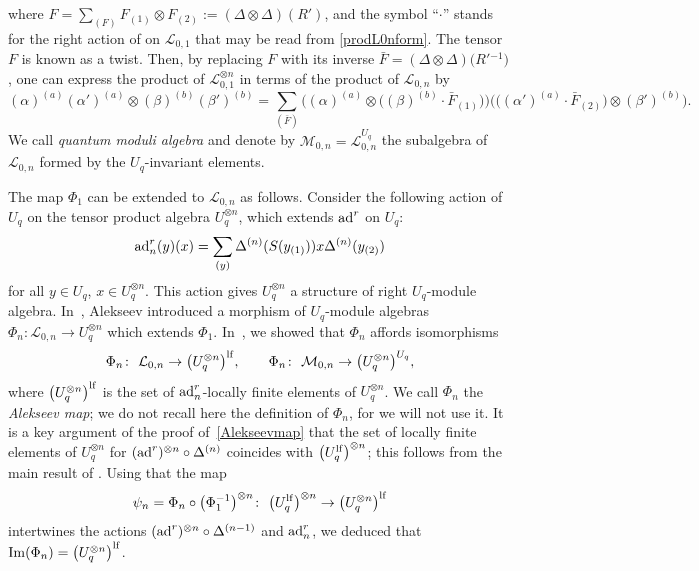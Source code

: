 \documentclass[pdftex]{sigma}
\numberwithin{equation}{section}
\theoremstyle{definition}
\newcommand{\mUq}{\mathbb{U}_q}
\newcommand{\Ll}{{\mathcal L}}
\newcommand{\Mm}{{\mathcal M}}
\newcommand{\ra}{\rightarrow}
\begin{document}
where $F=\sum_{(F)} F_{(1)}\otimes F_{(2)} := (\Delta \otimes \Delta)(R')$, and the symbol ``$\cdot$'' stands for the right action of \smash{$\mUq^{\hat \otimes 2}$} on $\Ll_{0,1}$ that may be read from \eqref{prodL0nform}. The tensor $F$ is known as a twist. Then, by replacing $F$ with its inverse $\bar{F} = (\Delta \otimes \Delta)\big(R'{}^{-1}\big)$, one can express the product of
$\Ll_{0,1}^{\otimes n}$ in terms of the product of $\Ll_{0,n}$ by
\begin{equation}\label{prodL0nform3}
(\alpha)^{(a)}(\alpha')^{(a)}\otimes (\beta)^{(b)}(\beta')^{(b)} = \sum_{(\bar{F})}\big((\alpha)^{(a)}\otimes
 \big((\beta)^{(b)}\cdot \bar{F}_{(1)}\big)\big) \big( \big((\alpha')^{(a)}\cdot \bar{F}_{(2)}\big)\otimes (\beta')^{(b)}\big).
\end{equation}
 We call {\it quantum moduli algebra} and denote by $\Mm_{0,n} = {\mathcal L}_{0,n}^{U_q}$ the subalgebra of $\Ll_{0,n}$ formed by the $U_q$-invariant elements.


The map $\Phi_1$ can be extended to $\Ll_{0,n}$ as follows. Consider the following action of $U_q$ on the tensor product algebra $U_q^{{\otimes} n}$, which extends ${\rm ad}^r$ on $U_q$:
\[%
{\rm ad}_n^r(y)(x) = \sum_{(y)}\Delta^{(n)}({S}(y_{(1)})) x \Delta^{(n)}(y_{(2)})
\]
for all $y \in U_q$, $x \in U_q^{{\otimes} n}$. This action gives $U_q^{{\otimes} n}$ a structure of right $U_q$-module algebra. In~\cite{A}, Alekseev introduced a morphism of $U_q$-module algebras $\Phi_n\colon \Ll_{0,n} \ra U_q^{\otimes n}$ which extends $\Phi_1$. In~\cite[Proposition~6.7]{BR}, we showed that $\Phi_n$ affords isomorphisms
\begin{equation}\label{Alekseevmap}
\Phi_n\colon\ \Ll_{0,n} \ra \big(U_q^{\otimes n}\big)^{\rm lf},\qquad \Phi_n\colon\ \Mm_{0,n}\rightarrow \big(U_q^{{\otimes} n}\big)^{U_q},
\end{equation}
where $\big(U_q^{\otimes n}\big)^{\rm lf}$ is the set of ${\rm ad}_n^r$-locally finite elements of $U_q^{{\otimes} n}$. We call $\Phi_n$ the {\it Alekseev map}; we do not recall here the definition of $\Phi_n$, for we will not use it. It is a key argument of the proof of~\eqref{Alekseevmap} that the set of locally finite elements of $U_q^{{\otimes} n}$ for $({\rm ad}^r)^{\otimes n}\circ \Delta^{(n)}$ coincides with $\big(U_q^{\rm lf}\big)^{\otimes n}$; this follows from the main result of \cite{KLNY}. Using that the map
\begin{equation}\label{Phipsi}
\psi_n = \Phi_n \circ \big(\Phi_1^{-1}\big)^{\otimes n}\colon\ \big(U_q^{\rm lf}\big)^{\otimes n}\ra \big(U_q^{\otimes n}\big)^{\rm lf}
\end{equation}
intertwines the actions $({\rm ad}^r)^{\otimes n}\circ \Delta^{(n-1)}$ and ${\rm ad}_n^r$, we deduced that ${\rm Im}(\Phi_n) = \big(U_q^{\otimes n}\big)^{\rm lf}$.
\end{document}
